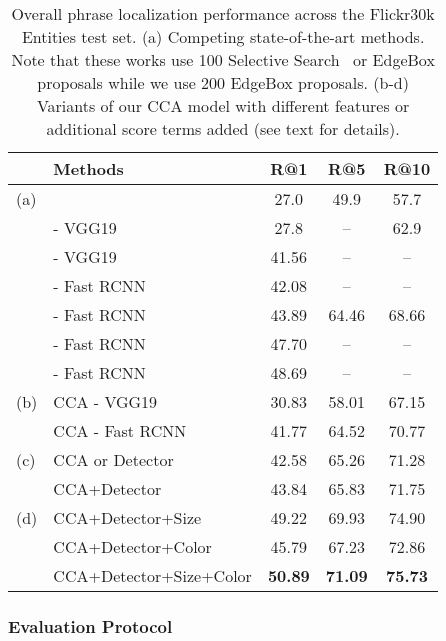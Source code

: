 \documentclass[twocolumn]{svjour3}
\begin{document}
\begin{table*}
\begin{center}
\caption{Overall phrase localization performance across the Flickr30k Entities test set. (a) Competing state-of-the-art methods. Note that these works use 100 Selective Search~\citep{selectivesearch} or EdgeBox proposals while we use 200 EdgeBox proposals. (b-d) Variants of our CCA model with different features or additional score terms added (see text for details).}
\label{table:phraseloc}
\begin{tabular}{|ll|c|c|c|}
\hline
& Methods & R@1 & R@5 & R@10 \\
\hline
\hline
 (a) & \citet{zhang2016EB} & { 27.0 } & { 49.9 } & { 57.7 } \\
 & \citet{hu2016natural} - VGG19  & { 27.8 } & { -- } & { 62.9 }  \\
 & \citet{rohrbach2015} - VGG19 & { 41.56 } & { -- } & { -- } \\
& \citet{wang2016matching} - Fast RCNN  & { 42.08 } & { -- } & { -- } \\
& \citet{deepspite2015} - Fast RCNN  & { 43.89 } & { 64.46 } & { 68.66 } \\
& \citet{rohrbach2015} - Fast RCNN  & { 47.70 } & { -- } & { -- }  \\
& \citet{fukui16emnlp} - Fast RCNN  & { 48.69 } & { -- } & { -- } \\
\hline
(b) & CCA - VGG19 & { 30.83 } & { 58.01 } & { 67.15 } \\
& CCA - Fast RCNN & { 41.77 } & { 64.52 } & { 70.77 } \\
\hline
(c) & CCA or Detector & { 42.58 } & { 65.26 } & { 71.28 } \\
& CCA+Detector  & { 43.84 } & { 65.83 } & { 71.75 } \\
\hline
(d) & CCA+Detector+Size & { 49.22 } & { 69.93 } & { 74.90 } \\
& CCA+Detector+Color & { 45.79 } & { 67.23 } & { 72.86 } \\
& CCA+Detector+Size+Color & \bf{ 50.89 } & \bf{ 71.09 } & {\bf 75.73} \\
\hline
\end{tabular}
\end{center}
\end{table*}



\subsubsection{Evaluation Protocol} 
\label{sec:localeval}
\end{document}
